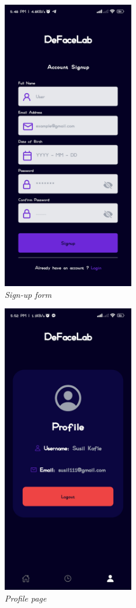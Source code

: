 \begin{figure}[ht]
    \centering
    \includegraphics[height= 5in]{img/form.jpg}
    \caption{\textit{Sign-up form}}
\end{figure}
\begin{figure}[ht]
    \centering
    \includegraphics[height= 5in]{img/profile.jpg}
    \caption{\textit{Profile page}}
\end{figure}
